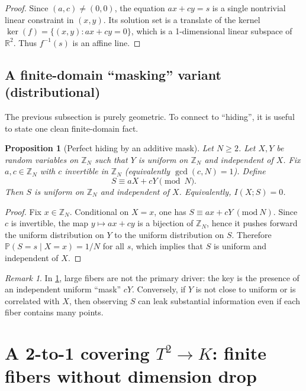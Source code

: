 \documentclass[11pt,a4paper]{article}
\newtheorem{proposition}[theorem]{Proposition}
\theoremstyle{definition}
\theoremstyle{remark}
\newtheorem{remark}[theorem]{Remark}
\begin{document}
\begin{proof}
Since \((a,c)\neq(0,0)\), the equation \(ax+cy=s\) is a single nontrivial linear constraint in \((x,y)\). Its solution set is a translate of the kernel \(\ker(f)=\{(x,y): ax+cy=0\}\), which is a 1-dimensional linear subspace of \(\mathbb{R}^2\). Thus \(f^{-1}(s)\) is an affine line.
\end{proof}

\subsection{A finite-domain ``masking'' variant (distributional)}
\label{sec:linear-masking}

The previous subsection is purely geometric. To connect to ``hiding'', it is useful to state one clean finite-domain fact.

\begin{proposition}[Perfect hiding by an additive mask]
\label{prop:perfect-hiding}
Let \(N\ge 2\). Let \(X,Y\) be random variables on \(\mathbb{Z}_N\) such that \(Y\) is uniform on \(\mathbb{Z}_N\) and independent of \(X\). Fix \(a,c\in\mathbb{Z}_N\) with \(c\) invertible in \(\mathbb{Z}_N\) (equivalently \(\gcd(c,N)=1\)). Define
\[
S \equiv aX + cY \pmod N.
\]
Then \(S\) is uniform on \(\mathbb{Z}_N\) and independent of \(X\). Equivalently, \(I(X;S)=0\).
\end{proposition}

\begin{proof}
Fix \(x\in\mathbb{Z}_N\). Conditional on \(X=x\), one has \(S\equiv ax + cY\ (\mathrm{mod}\ N)\). Since \(c\) is invertible, the map \(y\mapsto ax+cy\) is a bijection of \(\mathbb{Z}_N\), hence it pushes forward the uniform distribution on \(Y\) to the uniform distribution on \(S\). Therefore \(\mathbb{P}(S=s\mid X=x)=1/N\) for all \(s\), which implies that \(S\) is uniform and independent of \(X\).
\end{proof}

\begin{remark}
\label{rem:fiber-vs-entropy}
In \cref{prop:perfect-hiding}, large fibers are not the primary driver: the key is the presence of an independent uniform ``mask'' \(cY\). Conversely, if \(Y\) is not close to uniform or is correlated with \(X\), then observing \(S\) can leak substantial information even if each fiber contains many points.
\end{remark}

\section{A 2-to-1 covering \(T^2\to K\): finite fibers without dimension drop}
\label{sec:cover}
\end{document}
